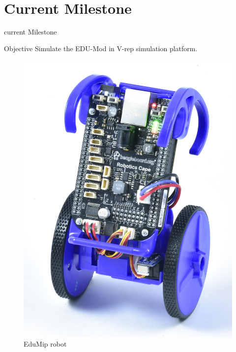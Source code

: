 \documentclass{beamer}
\begin{document}
\section{Current Milestone}
\begin{frame}{current Milestone}
\begin{block}{Objective}
Simulate the EDU-Mod in V-rep simulation platform.
\end{block}
\begin{figure}
\includegraphics[scale=0.2]{figs/img/eduMip.jpeg}
\caption{EduMip robot}
\end{figure}
\end{frame}
\end{document}
